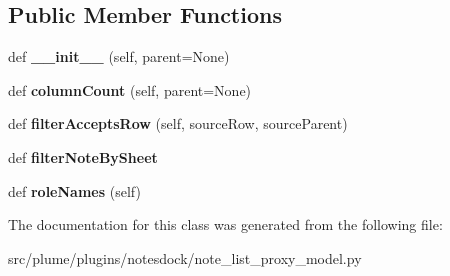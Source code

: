 \subsection*{Public Member Functions}
\begin{DoxyCompactItemize}
\item 
def {\bfseries \+\_\+\+\_\+init\+\_\+\+\_\+} (self, parent=None)\hypertarget{classnote__list__proxy__model_1_1_note_list_proxy_model_ab0148563d6b0d2e889053b5c8317acd5}{}\label{classnote__list__proxy__model_1_1_note_list_proxy_model_ab0148563d6b0d2e889053b5c8317acd5}

\item 
def {\bfseries column\+Count} (self, parent=None)\hypertarget{classnote__list__proxy__model_1_1_note_list_proxy_model_ae191e1b982e6d60fbc79c25a25339d6e}{}\label{classnote__list__proxy__model_1_1_note_list_proxy_model_ae191e1b982e6d60fbc79c25a25339d6e}

\item 
def {\bfseries filter\+Accepts\+Row} (self, source\+Row, source\+Parent)\hypertarget{classnote__list__proxy__model_1_1_note_list_proxy_model_aa061209b6ea78d494d386ad4c1e1c4c7}{}\label{classnote__list__proxy__model_1_1_note_list_proxy_model_aa061209b6ea78d494d386ad4c1e1c4c7}

\item 
def {\bfseries filter\+Note\+By\+Sheet}\hypertarget{classnote__list__proxy__model_1_1_note_list_proxy_model_abd2a12d00f7705d0e006f2d15f9c579e}{}\label{classnote__list__proxy__model_1_1_note_list_proxy_model_abd2a12d00f7705d0e006f2d15f9c579e}

\item 
def {\bfseries role\+Names} (self)\hypertarget{classnote__list__proxy__model_1_1_note_list_proxy_model_ae58aac201e2a3448599635feb92b75dd}{}\label{classnote__list__proxy__model_1_1_note_list_proxy_model_ae58aac201e2a3448599635feb92b75dd}

\end{DoxyCompactItemize}


The documentation for this class was generated from the following file\+:\begin{DoxyCompactItemize}
\item 
src/plume/plugins/notesdock/note\+\_\+list\+\_\+proxy\+\_\+model.\+py\end{DoxyCompactItemize}
